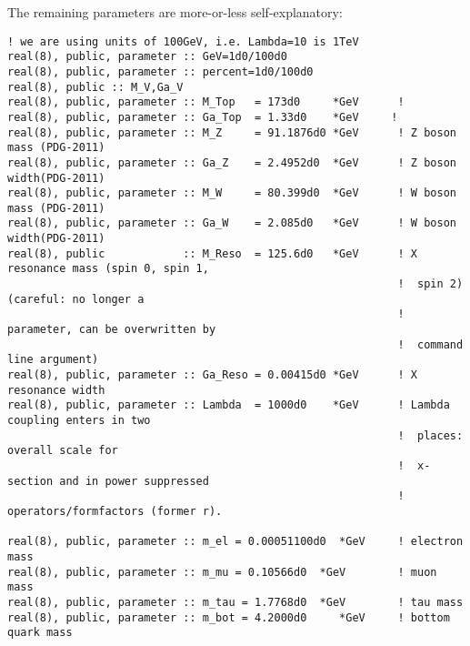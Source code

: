 \documentclass[aps,superscriptaddress,nofootinbib]{revtex4}
\begin{document}
The remaining parameters are more-or-less self-explanatory:
\begin{verbatim}
! we are using units of 100GeV, i.e. Lambda=10 is 1TeV
real(8), public, parameter :: GeV=1d0/100d0
real(8), public, parameter :: percent=1d0/100d0
real(8), public :: M_V,Ga_V
real(8), public, parameter :: M_Top   = 173d0     *GeV      !
real(8), public, parameter :: Ga_Top  = 1.33d0    *GeV     !
real(8), public, parameter :: M_Z     = 91.1876d0 *GeV      ! Z boson mass (PDG-2011)
real(8), public, parameter :: Ga_Z    = 2.4952d0  *GeV      ! Z boson width(PDG-2011)
real(8), public, parameter :: M_W     = 80.399d0  *GeV      ! W boson mass (PDG-2011)
real(8), public, parameter :: Ga_W    = 2.085d0   *GeV      ! W boson width(PDG-2011)
real(8), public            :: M_Reso  = 125.6d0   *GeV      ! X resonance mass (spin 0, spin 1,
                                                            !  spin 2) (careful: no longer a
                                                            !  parameter, can be overwritten by
                                                            !  command line argument)
real(8), public, parameter :: Ga_Reso = 0.00415d0 *GeV      ! X resonance width
real(8), public, parameter :: Lambda  = 1000d0    *GeV      ! Lambda coupling enters in two
                                                            !  places: overall scale for
                                                            !  x-section and in power suppressed
                                                            !  operators/formfactors (former r).

real(8), public, parameter :: m_el = 0.00051100d0  *GeV     ! electron mass
real(8), public, parameter :: m_mu = 0.10566d0  *GeV        ! muon mass
real(8), public, parameter :: m_tau = 1.7768d0  *GeV        ! tau mass
real(8), public, parameter :: m_bot = 4.2000d0     *GeV     ! bottom quark mass



\end{verbatim}
\end{document}
